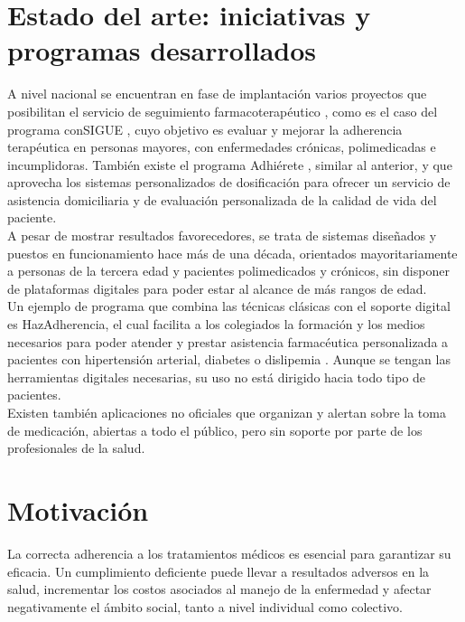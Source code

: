 \section{Estado del arte: iniciativas y programas desarrollados}
A nivel nacional se encuentran en fase de implantación varios proyectos que posibilitan el servicio de seguimiento farmacoterapéutico \cite{CONTHE2014336}, como es el caso del programa conSIGUE \cite{programa_consigue}, cuyo objetivo es evaluar y mejorar la adherencia terapéutica en personas mayores, con enfermedades crónicas, polimedicadas e incumplidoras. También existe el programa Adhiérete \cite{programa_adhierete_2015}, similar al anterior, y que aprovecha los sistemas personalizados de dosificación para ofrecer un servicio de asistencia domiciliaria y de evaluación personalizada de la calidad de vida del paciente. \\
A pesar de mostrar resultados favorecedores, se trata de sistemas diseñados y puestos en funcionamiento hace más de una década, orientados mayoritariamente a personas de la tercera edad y pacientes polimedicados y crónicos, sin disponer de plataformas digitales para poder estar al alcance de más rangos de edad. \\

Un ejemplo de programa que combina las técnicas clásicas con el soporte digital es HazAdherencia, el cual facilita a los colegiados la formación y los medios necesarios para poder atender y prestar asistencia farmacéutica personalizada a pacientes con hipertensión arterial, diabetes o dislipemia \cite{hazadherencia2024}. Aunque se tengan las herramientas digitales necesarias, su uso no está dirigido hacia todo tipo de pacientes. \\

Existen también aplicaciones no oficiales que organizan y alertan sobre la toma de medicación, abiertas a todo el público, pero sin soporte por parte de los profesionales de la salud.  \\



\section{Motivación}

La correcta adherencia a los tratamientos médicos es esencial para garantizar su eficacia. Un cumplimiento deficiente puede llevar a resultados adversos en la salud, incrementar los costos asociados al manejo de la enfermedad y afectar negativamente el ámbito social, tanto a nivel individual como colectivo.


